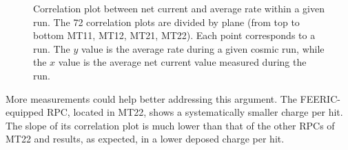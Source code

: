 
\begin{figure}[!t]
\begin{center}
\caption{Correlation plot between net current and average rate within a given run. The 72 correlation plots are divided by plane (from top to bottom MT11, MT12, MT21, MT22). Each point corresponds to a run. The $y$ value is the average rate during a given cosmic run, while the $x$ value is the average net current value measured during the run.}
\label{fig:iNetvsRate4Planes}
\end{center}
\end{figure}

More measurements could help better addressing this argument.
The FEERIC-equipped RPC, located in MT22, shows a systematically smaller charge per hit.
The slope of its correlation plot is much lower than that of the other RPCs of MT22 and results, as expected, in a lower deposed charge per hit.

